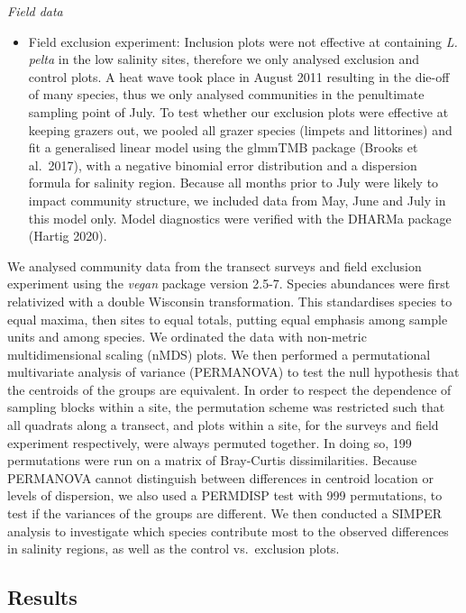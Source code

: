 \documentclass[
  11pt,
]{article}
\providecommand{\tightlist}{%
  \setlength{\itemsep}{0pt}\setlength{\parskip}{0pt}}
\begin{document}
\emph{Field data}

\begin{itemize}
\tightlist
\item
  Field exclusion experiment: Inclusion plots were not effective at containing \emph{L. pelta} in the low salinity sites, therefore we only analysed exclusion and control plots. A heat wave took place in August 2011 resulting in the die-off of many species, thus we only analysed communities in the penultimate sampling point of July. To test whether our exclusion plots were effective at keeping grazers out, we pooled all grazer species (limpets and littorines) and fit a generalised linear model using the glmmTMB package (Brooks et al.~2017), with a negative binomial error distribution and a dispersion formula for salinity region. Because all months prior to July were likely to impact community structure, we included data from May, June and July in this model only. Model diagnostics were verified with the DHARMa package (Hartig 2020).
\end{itemize}

We analysed community data from the transect surveys and field exclusion experiment using the \emph{vegan} package version 2.5-7. Species abundances were first relativized with a double Wisconsin transformation. This standardises species to equal maxima, then sites to equal totals, putting equal emphasis among sample units and among species. We ordinated the data with non-metric multidimensional scaling (nMDS) plots. We then performed a permutational multivariate analysis of variance (PERMANOVA) to test the null hypothesis that the centroids of the groups are equivalent. In order to respect the dependence of sampling blocks within a site, the permutation scheme was restricted such that all quadrats along a transect, and plots within a site, for the surveys and field experiment respectively, were always permuted together. In doing so, 199 permutations were run on a matrix of Bray-Curtis dissimilarities. Because PERMANOVA cannot distinguish between differences in centroid location or levels of dispersion, we also used a PERMDISP test with 999 permutations, to test if the variances of the groups are different. We then conducted a SIMPER analysis to investigate which species contribute most to the observed differences in salinity regions, as well as the control vs.~exclusion plots.

\hypertarget{results}{%
\subsection{Results}\label{results}}
\end{document}
